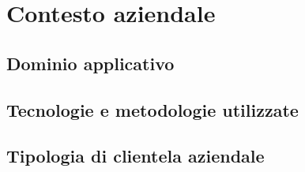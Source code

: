\documentclass[Tesi.tex]{subfiles}
\begin{document}
\chapter{Contesto aziendale}
\section{Dominio applicativo}
\section{Tecnologie e metodologie utilizzate}
\section{Tipologia di clientela aziendale}
\end{document}

